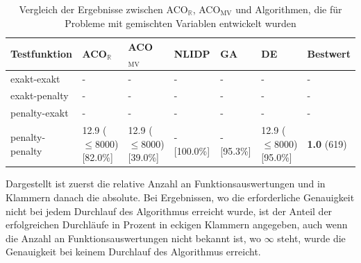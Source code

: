 \documentclass[fontsize=12, a4aper]{scrartcl}
\begin{document}
		\begin{table}[H]
		
		\caption{Vergleich der Ergebnisse zwischen ACO\(_\mathbb{R}\), ACO\(_\text{MV}\) und Algorithmen, die für Probleme mit gemischten Variablen entwickelt wurden}
		
		\label{subsubsec:Vergleich_Von_ACO_R_ACO_R_Very_Simple_Und_Iterationen:tab:Vergleich_CSD}
		
		\scriptsize
		
		\begin{tabularx}{\linewidth}{l X X X X X X}
			
			\toprule
			
			Testfunktion & ACO\(_\mathbb{R}\) & ACO\(_{\text{MV}}\) & NLIDP & GA & DE & Bestwert\\
			
			\midrule
			
			exakt-exakt & - & - & - & - & - & - \\
			
			exakt-penalty & - & - & - & - & - & - \\
			
			penalty-exakt & - & - & - & - & - & - \\
			
			penalty-penalty & 12.9 (\(\leq\)8000) [82.0\%] & 12.9 (\(\leq\)8000) [39.0\%] & - [100.0\%] & - [95.3\%] & 12.9 (\(\leq\)8000) [95.0\%] & \textbf{1.0} (619)\\
			
			\bottomrule
			
		\end{tabularx}
		
		\smallskip
		
		Dargestellt ist zuerst die relative Anzahl an Funktionsauswertungen und in Klammern danach die absolute. Bei Ergebnissen, wo die erforderliche Genauigkeit nicht bei jedem Durchlauf des Algorithmus erreicht wurde, ist der Anteil der erfolgreichen Durchläufe in Prozent in eckigen Klammern angegeben, auch wenn die Anzahl an Funktionsauswertungen nicht bekannt ist, wo \(\infty\) steht, wurde die Genauigkeit bei keinem Durchlauf des Algorithmus erreicht.\hfill\newline
		
	\end{table}
	
\end{document}
